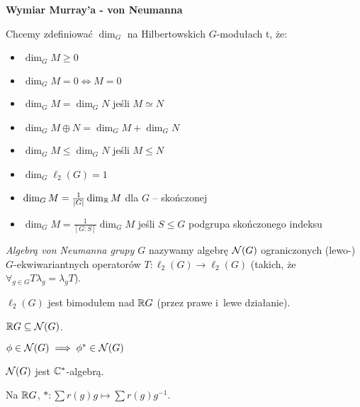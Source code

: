 

 


{\bf Wymiar Murray'a - von Neumanna}

\begin{uwaga}
	Chcemy zdefiniować $\dim_G$ na Hilbertowskich $G$-modułach t, że:
	\begin{itemize}
		\item $\dim_G M \geq 0$
		\item $\dim_G M  = 0 \iff M = 0$
		\item $\dim_G M = \dim_G N$ jeśli $M \simeq N$
		\item $\dim_G M \oplus N = \dim_G M + \dim_G N$
		\item $\dim_G M \leq \dim_G N$ jeśli $M \leq N$
		\item $\dim_G \ell_2(G) = 1$
		\item $\dim_G M = \frac{1}{|G|} \dim_{\mathbb{R}} M$ dla $G$ -- skończonej
		\item $\dim_G M = \frac{1}{[G:S]} \dim_G M$ jeśli $S \leq G$
		podgrupa skończonego indeksu
	\end{itemize}

\end{uwaga}

\begin{definicja}
	\emph{Algebrą von Neumanna grupy $G$} nazywamy algebrę ${\mathcal{N}}(G)$ 
	ograniczonych (lewo-) $G$-ekwiwariantnych operatorów 
	${T: \ell_2(G) \to \ell_2(G)}$ 
	(takich, że $\forall_{g \in G} {T \lambda_g = \lambda_g T}$).
	
	$\ell_2(G)$ jest bimodułem nad ${\mathbb{R}} G$ (przez prawe i~lewe działanie).
\end{definicja}

\begin{uwaga}
	${\mathbb{R}} G \subseteq {\mathcal{N}}(G)$.
\end{uwaga}

\begin{stwierdzenie}
	$\phi \in {\mathcal{N}}(G) \implies \phi^\ast \in {\mathcal{N}}(G)$
\end{stwierdzenie}

\begin{wniosek}
	${\mathcal{N}}(G)$ jest ${\mathbb{C}}^\ast$-algebrą.
\end{wniosek}

\begin{uwaga}
	Na ${\mathbb{R}} G$, $\ast: \sum r(g) g \mapsto \sum r(g) g^{-1}$.
\end{uwaga}

